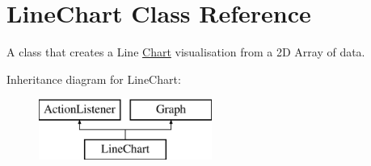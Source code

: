 \hypertarget{class_line_chart}{\section{Line\-Chart Class Reference}
\label{class_line_chart}
}


A class that creates a Line \hyperlink{interface_chart}{Chart} visualisation from a 2\-D Array of data.  


Inheritance diagram for Line\-Chart\-:\begin{figure}[H]
\begin{center}
\leavevmode
\includegraphics[height=2.000000cm]{class_line_chart}
\end{center}
\end{figure}
